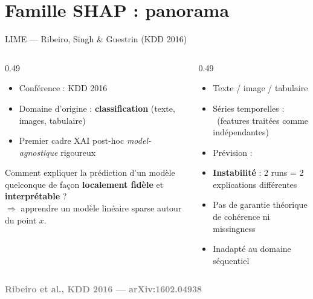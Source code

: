 \documentclass[10pt]{beamer}
\newcommand{\source}[1]{\vspace{4pt}\hfill{\textcolor{gray}{\textbf{\tiny #1}}}}
\begin{document}
\section{Famille SHAP : panorama}

\begin{frame}{LIME — Ribeiro, Singh \& Guestrin (KDD 2016)}
  \begin{columns}
    \begin{column}{0.49\textwidth}
      \begin{ctxbox}
        \begin{itemize}
          \item Conférence : KDD 2016
          \item Domaine d'origine : \textbf{classification}
                (texte, images, tabulaire)
          \item Premier cadre XAI post-hoc \emph{model-agnostique} rigoureux
        \end{itemize}
      \end{ctxbox}
      \begin{probbox}
        Comment expliquer la prédiction d'un modèle quelconque
        de façon \textbf{localement fidèle} et \textbf{interprétable} ?\\[2pt]
        $\Rightarrow$ apprendre un modèle linéaire sparse autour du point $x$.
      \end{probbox}
    \end{column}
    \begin{column}{0.49\textwidth}
      \begin{transposbox}
        \begin{itemize}
          \item Texte / image / tabulaire \checkmark
          \item Séries temporelles : \texttimes\ (features traitées comme indépendantes)
          \item Prévision : \texttimes
        \end{itemize}
      \end{transposbox}
      \begin{limitbox}
        \begin{itemize}
          \item \textbf{Instabilité} : 2 runs = 2 explications différentes
          \item Pas de garantie théorique de cohérence ni missingness
          \item Inadapté au domaine séquentiel
        \end{itemize}
      \end{limitbox}
    \end{column}
  \end{columns}
  \source{Ribeiro et al., KDD 2016 --- arXiv:1602.04938}
\end{frame}
\end{document}
